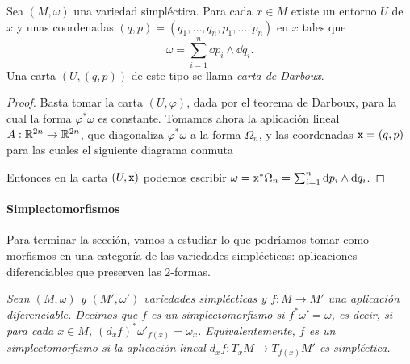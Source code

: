 \begin{corol}
  Sea $(M,\omega)$ una variedad simpléctica. Para cada $x\in M$ existe un entorno $U$ de $x$ y unas coordenadas $(q,p)=(q_1,\dots,q_n,p_1,\dots,p_n)$ en $x$ tales que 
\begin{equation*}
  \omega= \sum_{i=1}^n \dd p_i \wedge \dd q_i.
\end{equation*}
Una carta $(U,(q,p))$ de este tipo se llama \emph{carta de Darboux}.
\end{corol}
\begin{proof}
  Basta tomar la carta $(U,\varphi)$, dada por el teorema de Darboux, para la cual la forma $\varphi^*\omega$ es constante. Tomamos ahora la aplicación lineal $A:\mathbb{R}^{2n}\rightarrow \mathbb{R}^{2n}$, que diagonaliza $\varphi^*\omega$ a la forma $\Omega_n$, y las coordenadas $\mathtt{x}=(q,p)$ para las cuales el siguiente diagrama conmuta
  \begin{center}
   \end{center}
   Entonces en la carta $(U,\mathtt{x})$ podemos escribir $\omega=\mathtt{x}^*\Omega_n=\sum_{i=1}^n \mathrm{d} p_i \wedge \mathrm{d} q_i$.
\end{proof}

\paragraph{\bf Simplectomorfismos}\mbox{}

Para terminar la sección, vamos a estudiar lo que podríamos tomar como morfismos en una categoría de las variedades simplécticas: aplicaciones diferenciables que preserven las $2$-formas.
\begin{defn}
  \em
  Sean $(M,\omega)$ y $(M',\omega')$ variedades simplécticas y $f:M \rightarrow M'$ una aplicación diferenciable. Decimos que $f$ es un \emph{simplectomorfismo} si
    $f^* \omega' = \omega$,
  es decir, si para cada $x\in M$, $(d_xf)^*\omega'_{f(x)}=\omega_x$. Equivalentemente, $f$ es un simplectomorfismo si la aplicación lineal $d_xf:T_xM \rightarrow T_{f(x)}M'$ es simpléctica.
\end{defn}

